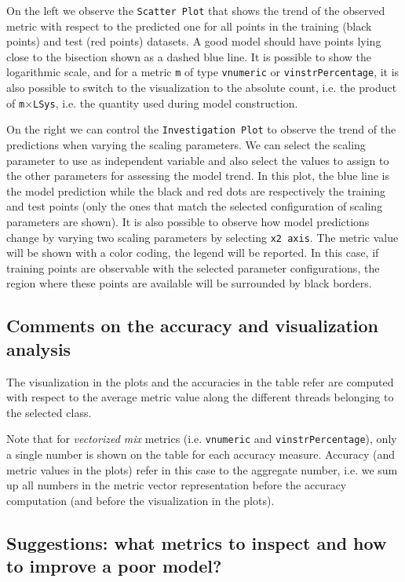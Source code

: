 \documentclass[a4paper, 10pt]{article}
\begin{document}
On the left we observe the \texttt{Scatter Plot}
that shows the trend of the observed metric with respect to the predicted one for all points in the training (black points) and test (red points)
datasets. A good model should have points lying close to the bisection shown as a dashed blue line. It is possible to show the logarithmic scale,
and for a metric \verb!m! of type \verb!vnumeric! or \verb!vinstrPercentage!,
it is also possible to switch to the visualization to the absolute count,
i.e. the product of \verb!m!$\times$\verb!LSys!, i.e. the quantity used during model construction.

On the right we can control the \texttt{Investigation Plot} to observe the trend of the predictions when varying the scaling parameters.
We can select the scaling parameter to use as independent variable and also select the values to assign to the other parameters for assessing
the model trend. In this plot, the blue line is the model prediction while the black and red dots are respectively the training and test points
(only the ones that match the selected configuration of scaling parameters are shown).
It is also possible to observe how model predictions change by varying two scaling parameters by selecting \texttt{x2 axis}.
The metric value will be shown with a color coding, the legend will be reported. In this case, if training points are observable
with the selected parameter configurations, the region where these points are available will be surrounded by black borders.

\subsection{Comments on the accuracy and visualization analysis}
The visualization in the plots and the accuracies in the table refer are computed with respect to the average metric value
along the different threads belonging to the selected class.

Note that for \textit{vectorized mix} metrics (i.e. \texttt{vnumeric} and \texttt{vinstrPercentage}),
only a single number is shown on the table for each accuracy measure. Accuracy (and metric values in the plots)
refer in this case to the aggregate number, i.e. we sum up all numbers in the metric vector representation
before the accuracy computation (and before the visualization in the plots).

\subsection{Suggestions: what metrics to inspect and how to improve a poor model?}
\end{document}
